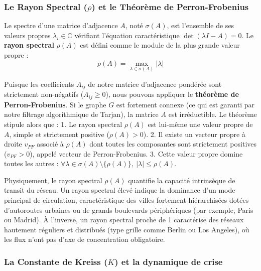 \documentclass[10pt, a4paper]{article}
\begin{document}
\subsubsection{\texorpdfstring{Le Rayon Spectral (\(\rho\)) et le
Théorème de
Perron-Frobenius}{Le Rayon Spectral (\textbackslash rho) et le Théorème de Perron-Frobenius}}\label{le-rayon-spectral-rho-et-le-thuxe9oruxe8me-de-perron-frobenius}

Le spectre d'une matrice d'adjacence \(A\), noté \(\sigma(A)\), est
l'ensemble de ses valeurs propres \(\lambda_i \in \mathbb{C}\) vérifiant
l'équation caractéristique \(\det(\lambda I - A) = 0\). Le \textbf{rayon
spectral} \(\rho(A)\) est défini comme le module de la plus grande
valeur propre : \[\rho(A) = \max_{\lambda \in \sigma(A)} |\lambda|\]

Puisque les coefficients \(A_{ij}\) de notre matrice d'adjacence
pondérée sont strictement non-négatifs (\(A_{ij} \ge 0\)), nous pouvons
appliquer le \textbf{théorème de Perron-Frobenius}. Si le graphe \(G\)
est fortement connexe (ce qui est garanti par notre filtrage
algorithmique de Tarjan), la matrice \(A\) est irréductible. Le théorème
stipule alors que : 1. Le rayon spectral \(\rho(A)\) est lui-même une
valeur propre de \(A\), simple et strictement positive
(\(\rho(A) > 0\)). 2. Il existe un vecteur propre à droite \(v_{PF}\)
associé à \(\rho(A)\) dont toutes les composantes sont strictement
positives (\(v_{PF} > 0\)), appelé vecteur de Perron-Frobenius. 3. Cette
valeur propre domine toutes les autres :
\(\forall \lambda \in \sigma(A) \setminus \{\rho(A)\}, \ |\lambda| \le \rho(A)\).

Physiquement, le rayon spectral \(\rho(A)\) quantifie la capacité
intrinsèque de transit du réseau. Un rayon spectral élevé indique la
dominance d'un mode principal de circulation, caractéristique des villes
fortement hiérarchisées dotées d'autoroutes urbaines ou de grands
boulevards périphériques (par exemple, Paris ou Madrid). À l'inverse, un
rayon spectral proche de 1 caractérise des réseaux hautement réguliers
et distribués (type grille comme Berlin ou Los Angeles), où les flux
n'ont pas d'axe de concentration obligatoire.

\subsubsection{\texorpdfstring{La Constante de Kreiss (\(K\)) et la
dynamique de
crise}{La Constante de Kreiss (K) et la dynamique de crise}}\label{la-constante-de-kreiss-k-et-la-dynamique-de-crise}
\end{document}
